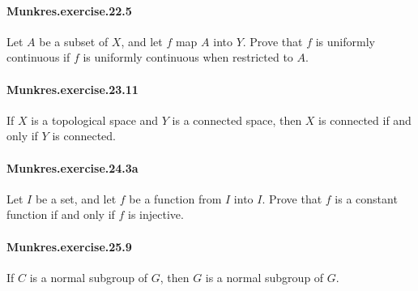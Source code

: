 \documentclass{article}
\begin{document}


\paragraph{Munkres.exercise.22.5} Let $A$ be a subset of $X$, and let $f$ map $A$ into $Y$. Prove that $f$ is uniformly continuous if $f$ is uniformly continuous when restricted to $A$.



\paragraph{Munkres.exercise.23.11} If $X$ is a topological space and $Y$ is a connected space, then $X$ is connected if and only if $Y$ is connected.

\paragraph{Munkres.exercise.24.3a} Let $I$ be a set, and let $f$ be a function from $I$ into $I$. Prove that $f$ is a constant function if and only if $f$ is injective.

\paragraph{Munkres.exercise.25.9} If $C$ is a normal subgroup of $G$, then $G$ is a normal subgroup of $G$.
\end{document}
